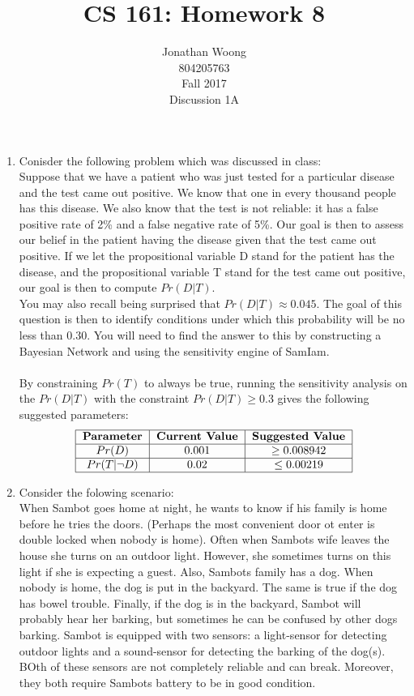 \documentclass[10.5pt,letterpaper]{article}
\date{\displaydate{date}}
\begin{document}
\title{CS 161: Homework 8}
\author{
	Jonathan Woong\\
	804205763\\
	Fall 2017\\
	Discussion 1A}
\maketitle
\pagebreak


\begin{enumerate}[label=\textbf{Problem \arabic*.}]
\item Conisder the following problem which was discussed in class: \\
Suppose that we have a patient who was just tested for a particular disease and the test came out positive. We know that one in every thousand people has this disease. We also know that the test is not reliable: it has a false positive rate of 2\% and a false negative rate of 5\%. Our goal is then to assess our belief in the patient having the disease given that the test came out positive. If we let the propositional variable D stand for the patient has the disease, and the propositional variable T stand for the test came out positive, our goal is then to compute $Pr(D|T)$.\\
You may also recall being surprised that $Pr(D|T)\approx 0.045$. The goal of this question is then to identify conditions under which this probability will be no less than 0.30. You will need to find the answer to this by constructing a Bayesian Network and using the sensitivity engine of SamIam.\\\\
By constraining $Pr(T)$ to always be true, running the sensitivity analysis on the $Pr(D|T)$ with the constraint $Pr(D|T)\geq 0.3$ gives the following suggested parameters:
\[\begin{tabular} {|c|c|c|}
\hline
\textbf{Parameter} & \textbf{Current Value} & \textbf{Suggested Value} \\
\hline
$Pr(D)$ & 0.001 & $\geq 0.008942$ \\
\hline
$Pr(T|\lnot D)$ & 0.02 & $\leq 0.00219$ \\
\hline
\end{tabular}\]
\item Consider the folowing scenario:\\
When Sambot goes home at night, he wants to know if his family is home before he tries the doors. (Perhaps the most convenient door ot enter is double locked when nobody is home). Often when Sambots wife leaves the house she turns on an outdoor light. However, she sometimes turns on this light if she is expecting a guest. Also, Sambots family has a dog. When nobody is home, the dog is put in the backyard. The same is true if the dog has bowel trouble. Finally, if the dog is in the backyard, Sambot will probably hear her barking, but sometimes he can be confused by other dogs barking. Sambot is equipped with two sensors: a light-sensor for detecting outdoor lights and a sound-sensor for detecting the barking of the dog(s). BOth of these sensors are not completely reliable and can break. Moreover, they both require Sambots battery to be in good condition.\\

\end{enumerate}
\end{document}
